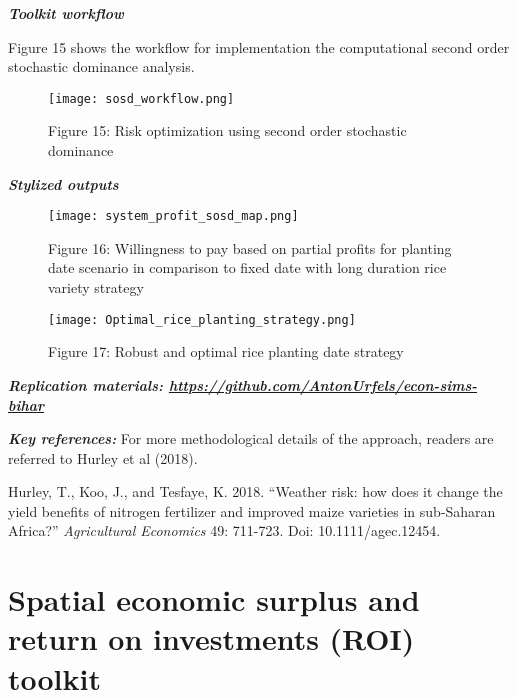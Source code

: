 \documentclass[
  letterpaper,
  DIV=11,
  numbers=noendperiod]{scrreprt}
\begin{document}
\textbf{\emph{Toolkit workflow}}

Figure 15 shows the workflow for implementation the computational second
order stochastic dominance analysis.

\begin{figure}[H]

{\centering \texttt{[image: sosd\_workflow.png]}

}

\caption{Figure 15: Risk optimization using second order stochastic
dominance}

\end{figure}%

\textbf{\emph{Stylized outputs}}

\begin{figure}[H]

{\centering \texttt{[image: system\_profit\_sosd\_map.png]}

}

\caption{Figure 16: Willingness to pay based on partial profits for
planting date scenario in comparison to fixed date with long duration
rice variety strategy}

\end{figure}%
\begin{figure}[H]

{\centering \texttt{[image: Optimal\_rice\_planting\_strategy.png]}

}

\caption{Figure 17: Robust and optimal rice planting date strategy}

\end{figure}%

\textbf{\emph{Replication materials:
\url{https://github.com/AntonUrfels/econ-sims-bihar}}}

\textbf{\emph{Key references:}} For more methodological details of the
approach, readers are referred to Hurley et al (2018).

Hurley, T., Koo, J., and Tesfaye, K. 2018. ``Weather risk: how does it
change the yield benefits of nitrogen fertilizer and improved maize
varieties in sub-Saharan Africa?'' \emph{Agricultural Economics} 49:
711-723. Doi: 10.1111/agec.12454.


\chapter{Spatial economic surplus and return on investments (ROI)
toolkit}\label{spatial-economic-surplus-and-return-on-investments-roi-toolkit}
\end{document}
